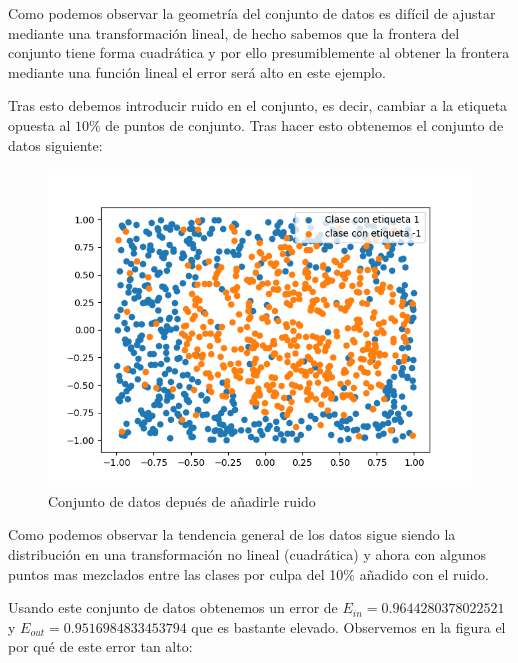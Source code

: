 \documentclass[12pt,a4paper]{article}
\begin{document}
Como podemos observar la geometría del conjunto de datos es difícil de ajustar mediante una transformación lineal, de hecho sabemos que la frontera del conjunto tiene forma cuadrática y por ello presumiblemente al obtener la frontera mediante una función lineal el error será alto en este ejemplo.

Tras esto debemos introducir ruido en el conjunto, es decir, cambiar a la etiqueta opuesta al $10\%$ de puntos de conjunto. Tras hacer esto obtenemos el conjunto de datos siguiente:

\begin{figure}[H]
	\centering
	\includegraphics[scale=0.8]{./Imagenes/ej2-2-2.png}
	\caption{Conjunto de datos depués de añadirle ruido}
	\label{ej2-2-2}
\end{figure}

Como podemos observar la tendencia general de los datos sigue siendo la distribución en una  transformación no lineal (cuadrática) y ahora con algunos puntos mas mezclados entre las clases por culpa del 10\% añadido con el ruido.

Usando este conjunto de datos obtenemos un error de $E_{in} = 0.9644280378022521$ y $E_{out} = 0.9516984833453794$ que es bastante elevado. Observemos en la figura el por qué de este error tan alto:
\end{document}
